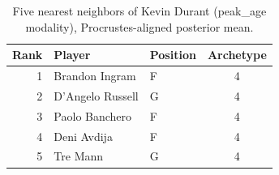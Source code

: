 \begin{table}[htbp]
  \centering\small
  \begin{tabular}{rllc}
    \toprule
    Rank & Player & Position & Archetype \\
    \midrule
    1 & Brandon Ingram & F & 4 \\
    2 & D'Angelo Russell & G & 4 \\
    3 & Paolo Banchero & F & 4 \\
    4 & Deni Avdija & F & 4 \\
    5 & Tre Mann & G & 4 \\
    \bottomrule
  \end{tabular}
  \caption{Five nearest neighbors of Kevin Durant (peak_age modality), Procrustes-aligned posterior mean.}
  \label{tab:Kevin_Durant_neighbors_peak_age}
\end{table}

